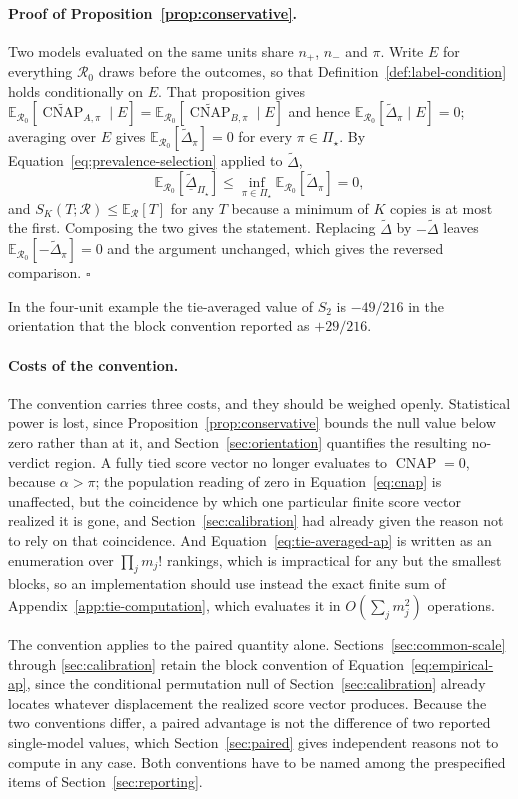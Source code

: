 \documentclass[11pt]{article}
\newcommand{\CNAP}{\operatorname{CNAP}}
\newcommand{\Regime}{\mathcal{R}}
\newcommand{\PSet}{\Pi_\star}
\newcommand{\E}{\mathbb{E}}
\newcommand{\CNAPta}{\widetilde{\CNAP}}
\newcommand{\Dta}{\widetilde{\Delta}}
\newcommand{\RobDta}{\underline{\widetilde{\Delta}}_{\PSet}}
\theoremstyle{remark}
\begin{document}
\paragraph{Proof of Proposition~\ref{prop:conservative}.}
Two models evaluated on the same units share $n_+$, $n_-$ and $\pi$. Write $E$ for everything $\Regime_0$ draws before the outcomes, so that Definition~\ref{def:label-condition} holds conditionally on $E$. That proposition gives $\E_{\Regime_0}[\CNAPta_{A,\pi}\mid E]=\E_{\Regime_0}[\CNAPta_{B,\pi}\mid E]$ and hence $\E_{\Regime_0}[\Dta_\pi\mid E]=0$; averaging over $E$ gives $\E_{\Regime_0}[\Dta_\pi]=0$ for every $\pi\in\PSet$. By Equation~\eqref{eq:prevalence-selection} applied to $\Dta$,
\[
\E_{\Regime_0}[\RobDta]
\leq
\inf_{\pi\in\PSet}\E_{\Regime_0}[\Dta_\pi]
=0 ,
\]
and $S_K(T;\Regime)\leq\E_{\Regime}[T]$ for any $T$ because a minimum of $K$ copies is at most the first. Composing the two gives the statement. Replacing $\Dta$ by $-\Dta$ leaves $\E_{\Regime_0}[-\Dta_\pi]=0$ and the argument unchanged, which gives the reversed comparison. $\square$

In the four-unit example the tie-averaged value of $S_2$ is $-49/216$ in the orientation that the block convention reported as $+29/216$.

\paragraph{Costs of the convention.}
The convention carries three costs, and they should be weighed openly. Statistical power is lost, since Proposition~\ref{prop:conservative} bounds the null value below zero rather than at it, and Section~\ref{sec:orientation} quantifies the resulting no-verdict region. A fully tied score vector no longer evaluates to $\CNAP=0$, because $\alpha>\pi$; the population reading of zero in Equation~\eqref{eq:cnap} is unaffected, but the coincidence by which one particular finite score vector realized it is gone, and Section~\ref{sec:calibration} had already given the reason not to rely on that coincidence. And Equation~\eqref{eq:tie-averaged-ap} is written as an enumeration over $\prod_j m_j!$ rankings, which is impractical for any but the smallest blocks, so an implementation should use instead the exact finite sum of Appendix~\ref{app:tie-computation}, which evaluates it in $O(\sum_j m_j^2)$ operations.

The convention applies to the paired quantity alone. Sections~\ref{sec:common-scale} through \ref{sec:calibration} retain the block convention of Equation~\eqref{eq:empirical-ap}, since the conditional permutation null of Section~\ref{sec:calibration} already locates whatever displacement the realized score vector produces. Because the two conventions differ, a paired advantage is not the difference of two reported single-model values, which Section~\ref{sec:paired} gives independent reasons not to compute in any case. Both conventions have to be named among the prespecified items of Section~\ref{sec:reporting}.
\end{document}
